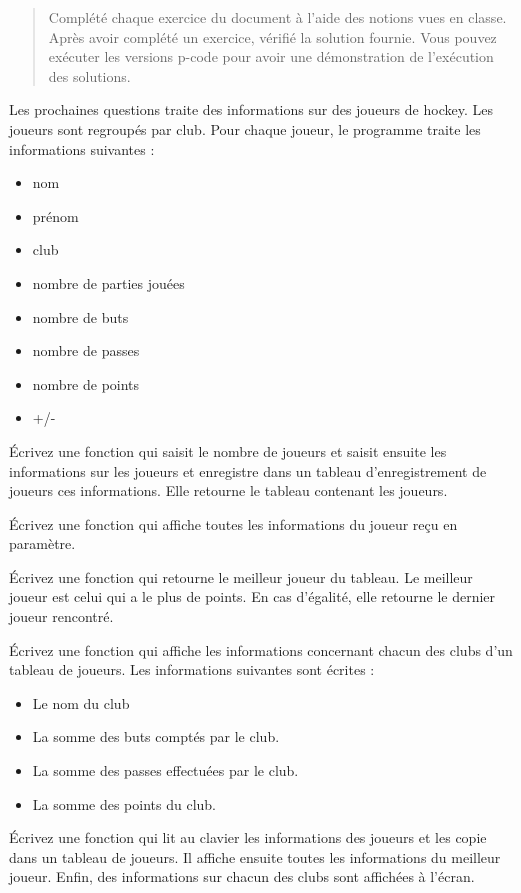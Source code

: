 \documentclass{article}
\begin{document}
\thispagestyle{plain}
\noindent{}

\renewcommand{\abstractname}{Instructions}
\begin{abstract}
	Complété chaque exercice du document à l’aide des notions vues en classe.
Après avoir complété un exercice, vérifié la solution fournie. Vous pouvez exécuter les versions p-code pour avoir une démonstration de l’exécution des solutions.
\end{abstract}

Les prochaines questions traite des informations sur des joueurs de hockey. Les joueurs sont regroupés par club. Pour chaque joueur, le programme traite les informations suivantes :
\begin{itemize}
	\setlength\itemsep{0em}
	\item nom
	\item prénom
	\item club
	\item nombre de parties jouées
	\item nombre de buts
	\item nombre de passes
	\item nombre de points
	\item +/-
\end{itemize}

\begin{question}[subtitle={Lire Joueurs}]
	Écrivez une fonction qui saisit le nombre de joueurs et saisit ensuite les informations sur les joueurs et enregistre dans un tableau d'enregistrement de joueurs ces informations. Elle retourne le tableau contenant les joueurs.
\end{question}

\begin{question}[subtitle={Affiche joueur}]
	Écrivez une fonction qui affiche toutes les informations du joueur reçu en paramètre.
\end{question}

\begin{question}[subtitle={Meilleur Joueur}]
	Écrivez une fonction qui retourne le meilleur joueur du tableau. Le meilleur joueur est celui qui a le plus de points. En cas d'égalité, elle retourne le dernier joueur rencontré.
\end{question}

\begin{question}[subtitle={Infos Club}]
	Écrivez une fonction qui affiche les informations concernant chacun des clubs d'un tableau de joueurs. Les informations suivantes sont écrites :
\begin{itemize}
	\setlength\itemsep{0em}
	\item Le nom du club
	\item La somme des buts comptés par le club.
	\item La somme des passes effectuées par le club.
	\item La somme des points du club.
\end{itemize}
\end{question}

\begin{question}[subtitle={Hockey}]
	Écrivez une fonction qui lit au clavier les informations des joueurs et les copie dans un tableau de joueurs. Il affiche ensuite toutes les informations du meilleur joueur. Enfin, des informations sur chacun des clubs sont affichées à l'écran.
\end{question}
\end{document}
